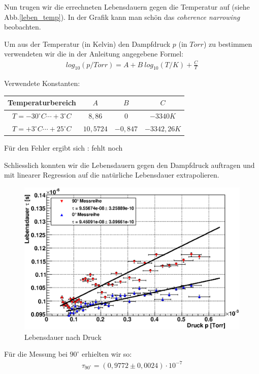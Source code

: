 \documentclass[12pt]{article}
\begin{document}
Nun trugen wir die errechneten Lebensdauern gegen die Temperatur auf (siehe Abb.\ref{leben_temp}). In der Grafik kann man schön das 
\textit{coherence narrowing} beobachten.

Um aus der Temperatur (in Kelvin) den Dampfdruck $p$ (in $Torr$) zu bestimmen verwendeten wir die in der Anleitung angegebene Formel:
\begin{align}
 log_{10}(p/Torr) = A + B ~ log_{10}(T/K) + \frac{C}{T}
\end{align}

Verwendete Konstanten: \\
\begin{tabular}{|c|c|c|c|}
 \hline
 Temperaturbereich&$A$&$B$&$C$\\
 \hline
 $T = -30^\circ C \cdots +3^\circ C$&$8,86$&$0$&$-3340K$ \\
 $T = +3^\circ C \cdots +25^\circ C$&$10,5724$&$-0,847$&$-3342,26K$ \\
 \hline
\end{tabular}

Für den Fehler ergibt sich : fehlt noch

Schliesslich konnten wir die Lebensdauern gegen den Dampfdruck auftragen und mit linearer Regression auf die natürliche Lebensdauer extrapolieren.

\begin{figure}[H]  
\centering
\includegraphics[width=0.9\linewidth]{pictures/lebensdauer_druck.eps}
\caption{Lebensdauer nach Druck}
\end{figure}

Für die Messung bei $90^\circ$ erhielten wir so:
\begin{align}
 \tau_{90^\circ} = (0,9772 \pm 0,0024) \cdot 10^{-7}
\end{align}
\end{document}
